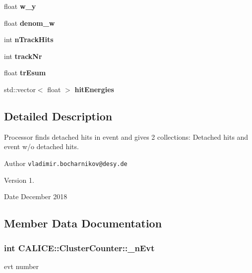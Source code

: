 \begin{DoxyCompactItemize}
\item 
float {\bfseries w\-\_\-y}\label{classCALICE_1_1ClusterCounter_a197cfacf40a5cd66331d278237e0f396}

\item 
float {\bfseries denom\-\_\-w}\label{classCALICE_1_1ClusterCounter_af040902ac4a8a8c3b17e7a93708be566}

\item 
int {\bfseries n\-Track\-Hits}\label{classCALICE_1_1ClusterCounter_a9869b8046c512b783427a5bfe820b384}

\item 
int {\bfseries track\-Nr}\label{classCALICE_1_1ClusterCounter_a73fd682f635eb37e350ef447abaed972}

\item 
float {\bfseries tr\-Esum}\label{classCALICE_1_1ClusterCounter_a1a189518671f3d5b77cf08cf32ab18c0}

\item 
std\-::vector$<$ float $>$ {\bfseries hit\-Energies}\label{classCALICE_1_1ClusterCounter_ab1608ebe4c4b6e1d544f407c008cfcd0}

\end{DoxyCompactItemize}


\subsection{Detailed Description}
Processor finds detached hits in event and gives 2 collections\-: Detached hits and event w/o detached hits. 

\begin{DoxyAuthor}{Author}
{\tt vladimir.\-bocharnikov@desy.\-de} 
\end{DoxyAuthor}
\begin{DoxyVersion}{Version}
1. 
\end{DoxyVersion}
\begin{DoxyDate}{Date}
December 2018 
\end{DoxyDate}


\subsection{Member Data Documentation}
\subsubsection[{\-\_\-n\-Evt}]{\setlength{\rightskip}{0pt plus 5cm}int C\-A\-L\-I\-C\-E\-::\-Cluster\-Counter\-::\-\_\-n\-Evt\hspace{0.3cm}{\ttfamily [protected]}}\label{classCALICE_1_1ClusterCounter_acd3e96d9b95b78f5902e484f20e2b9ab}
evt number 
